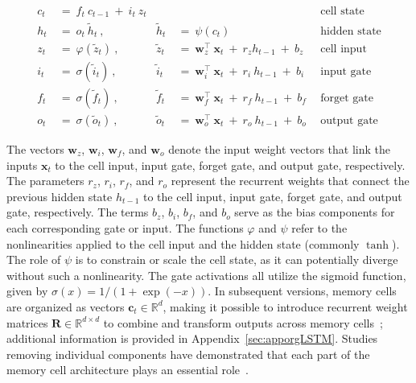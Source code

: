 \begin{align}
c_t \ &= \  f_t \ c_{t-1} \ + \ i_t \ z_t &  & &\text{cell state} \\
h_t  \ &= \ o_t \ \tilde{h}_t \ , & \tilde{h}_t \ &= \ \psi \left( c_t\right)
  &\text{hidden state} \\
z_t \ &= \ \varphi \left( \tilde{z}_t \right) \ , 
  &\tilde{z}_t \ &=  \ \mathbf{w}^\top_{z} \ \mathbf{x}_t \ + \
  r_{z}  h_{t-1} \ + \  b_{z} \ \
  &\text{cell input} \\
i_t \ &= \ \sigma \left( \tilde{i}_t  \right) \ , 
  &\tilde{i}_t \ &= \ \mathbf{w}^\top_{i} \ \mathbf{x}_t \ + \
  r_{i}  \ h_{t-1} \ + \  b_{i} \ \
  &\text{input gate} \\
f_t \ &= \ \sigma \left(  \tilde{f}_t \right) \ , 
  &\tilde{f}_t \ &= \ \mathbf{w}^\top_{f} \ \mathbf{x}_t  \ + \
  r_{f}  \ h_{t-1} \ + \  b_{f} \ \
  &\text{forget gate} \\
o_t \ &= \ \sigma \left( \tilde{o}_t \right) \ , 
  &\tilde{o}_t  \ &= \ \mathbf{w}^\top_{o} \ \mathbf{x}_t \ + \
  r_{o}  \ h_{t-1} \ + \  b_{o} \ \
  &\text{output gate} 
\end{align}

The vectors $\mathbf{w}_{z}$, $\mathbf{w}_{i}$, $\mathbf{w}_{f}$, and $\mathbf{w}_{o}$ denote the input weight vectors that link the inputs $\mathbf{x}_t$ to the cell input, input gate, forget gate, and output gate, respectively. The parameters $r_{z}$, $r_{i}$, $r_{f}$, and $r_{o}$ represent the recurrent weights that connect the previous hidden state $h_{t-1}$ to the cell input, input gate, forget gate, and output gate, respectively. The terms $b_{z}$, $b_{i}$, $b_{f}$, and $b_{o}$ serve as the bias components for each corresponding gate or input. The functions $\varphi$ and $\psi$ refer to the nonlinearities applied to the cell input and the hidden state (commonly $\tanh$). The role of $\psi$ is to constrain or scale the cell state, as it can potentially diverge without such a nonlinearity. The gate activations all utilize the sigmoid function, given by $\sigma \left( x \right)= 1/(1+\exp(-x))$. In subsequent versions, memory cells are organized as vectors $\mathbf{c}_t \in \mathbb{R}^{d}$, making it possible to introduce recurrent weight matrices $\mathbf{R} \in \mathbb{R}^{d \times d}$ to combine and transform outputs across memory cells~\citep{Greff:15}; additional information is provided in Appendix~\ref{sec:apporgLSTM}. Studies removing individual components have demonstrated that each part of the memory cell architecture plays an essential role~\citep{Greff:15}.

